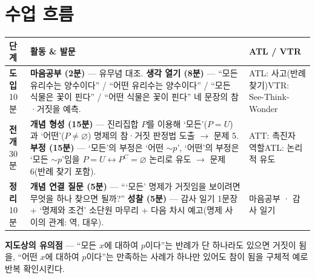 \documentclass[11pt,a4paper]{article}
\begin{document}
\section{수업 흐름}
\begin{tabularx}{\linewidth}{@{}>{\centering\arraybackslash}p{1.6cm}X>{\raggedright\arraybackslash\small}p{3.1cm}@{}}
\toprule
\textbf{단계} & \textbf{활동 \& 발문} & \textbf{ATL / VTR} \\
\midrule
\textcolor{goldstrong}{\textbf{도입}}\newline\footnotesize 10분 &
\textbf{마음공부 (2분)} --- 유무념 대조.\newline
\textbf{생각 열기 (8분)} --- ``모든 유리수는 양수이다'' / ``어떤 유리수는 양수이다'' / ``모든 식물은 꽃이 핀다'' / ``어떤 식물은 꽃이 핀다'' 네 문장의 참·거짓을 예측. &
ATL: 사고(반례 찾기)\newline VTR: See-Think-Wonder \\
\addlinespace
\textcolor{goldstrong}{\textbf{전개}}\newline\footnotesize 30분 &
\textbf{개념 형성 (15분)} --- 진리집합 $P$를 이용해 `모든'($P=U$)과 `어떤'($P\neq\varnothing$) 명제의 참·거짓 판정법 도출 $\to$ 문제 5.\newline
\textbf{부정 (15분)} --- `모든'의 부정은 `어떤 $\sim p$', `어떤'의 부정은 `모든 $\sim p$'임을 $P=U \leftrightarrow P^C=\varnothing$ 논리로 유도 $\to$ 문제 6(반례 찾기 포함). &
ATT: 촉진자 역할\newline ATL: 논리적 유도 \\
\addlinespace
\textcolor{goldstrong}{\textbf{정리}}\newline\footnotesize 10분 &
\textbf{개념 연결 질문 (5분)} --- ```모든' 명제가 거짓임을 보이려면 무엇을 하나 찾으면 될까?''\newline
\textbf{성찰 (5분)} --- 감사 일기 1문장 + `명제와 조건' 소단원 마무리 + 다음 차시 예고(명제 사이의 관계: 역, 대우). &
마음공부 · 감사 일기 \\
\bottomrule
\end{tabularx}

\begin{calloutbox}
\textbf{지도상의 유의점} --- ``모든 $x$에 대하여 $p$이다''는 반례가 단 하나라도 있으면 거짓이 됨을, ``어떤 $x$에 대하여 $p$이다''는 만족하는 사례가 하나만 있어도 참이 됨을 구체적 예로 반복 확인시킨다.
\end{calloutbox}
\end{document}

